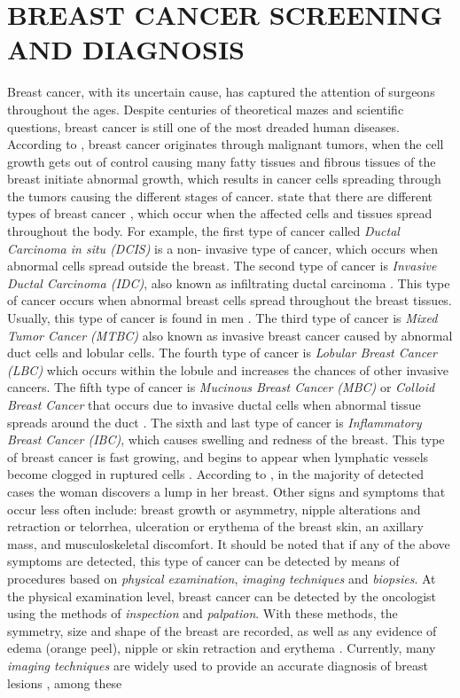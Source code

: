 \section{BREAST CANCER SCREENING AND DIAGNOSIS}
Breast cancer, with its uncertain cause, has captured the attention of surgeons throughout the ages. Despite centuries of theoretical mazes and scientific questions, breast cancer is still one of the most dreaded human diseases\cite{Bland2009}. According to \cite{Fatima2020}, breast cancer originates through malignant tumors, when the cell growth gets out of control causing many fatty tissues and fibrous tissues of the breast initiate abnormal growth, which results in cancer cells spreading through the tumors causing the different stages of cancer. \cite{Fatima2020} state that there are different types of breast cancer \cite{Sun2017}, which occur when the affected cells and tissues spread throughout the body. For example, the first type of cancer called \textit{Ductal Carcinoma in situ (DCIS)} is a non- invasive type of cancer\cite{Hou2020}, which occurs when abnormal cells spread outside the breast. The second type of cancer is \textit{Invasive Ductal Carcinoma (IDC)}, also known as infiltrating ductal carcinoma \cite{Chaudhury2011}. This type of cancer occurs when abnormal breast cells spread throughout the breast tissues. Usually, this type of cancer is found in men \cite{Page1982}. The third type of cancer is \textit{Mixed Tumor Cancer (MTBC)} also known as invasive breast cancer\cite{Tuck1997}  caused by abnormal duct cells and lobular cells\cite{Lee2017}. The fourth type of cancer is \textit{Lobular Breast Cancer (LBC)}\cite{Masciari2007}  which occurs within the lobule and increases the chances of other invasive cancers. The fifth type of cancer is \textit{Mucinous Breast Cancer (MBC)} or \textit{Colloid Breast Cancer}\cite{Memis2000} that occurs due to invasive ductal cells when abnormal tissue spreads around the duct \cite{Gradilone2011}. The sixth and last type of cancer is \textit{Inflammatory Breast Cancer (IBC)}, which causes swelling and redness of the breast. This type of breast cancer is fast growing, and begins to appear when lymphatic vessels become clogged in ruptured cells \cite{Robertson2010}. According to \cite{Brunicardi2010}, in the majority of detected cases the woman discovers a lump in her breast. Other signs and symptoms that occur less often include: breast growth or asymmetry, nipple alterations and retraction or telorrhea, ulceration or erythema of the breast skin, an axillary mass, and musculoskeletal discomfort. It should be noted that if any of the above symptoms are detected, this type of cancer can be detected by means of procedures based on \textit{physical examination}, \textit{imaging techniques} and \textit{biopsies}. At the physical examination level, breast cancer can be detected by the oncologist using the methods of \textit{inspection} and \textit{palpation}. With these methods, the symmetry, size and shape of the breast are recorded, as well as any evidence of edema (orange peel), nipple or skin retraction and erythema \cite{Brunicardi2010}. Currently, many \textit{imaging techniques} are widely used to provide an accurate diagnosis of breast lesions \cite{Tamam2021}, among these 